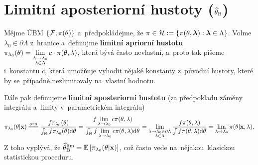 \section{Limitní aposteriorní hustoty ($\widehat{\theta}_\mathrm{B}$)}
\begin{define}
	Mějme ÚBM $\{\mathcal{F},\pi(\theta)\}$ a~předpokládejme, že $\pi\in\mathcal{H}:=\{\pi(\theta,\boldsymbol{\lambda}):\boldsymbol{\lambda}\in\Lambda\}$. Volme $\lambda_0\in\partial\Lambda$ z~hranice a~definujme \textbf{limitní apriorní hustotu} $\pi_{\lambda_0}(\theta)=\lim\limits_{\substack{
			\lambda\to\lambda_0\\\lambda\in\Lambda	}
	}c\cdot \pi(\theta,\lambda)$, která bývá často nevlastní, a~proto tak píšeme i~konstantu $c$, která umožňuje vyhodit nějaké konstanty z~původní hustoty, které by se~případně nezlimitovaly na~vlastní hodnotu. 
\end{define}

\begin{define}
	Dále pak definujeme \textbf{limitní aposteriorní hustotu} (za předpokladu záměny integrálu a~limity v~parametrickém integrálu) $$\pi_{\lambda_0}(\t|\textbf{x})\equal{ozn}\frac{f\pi_{\lambda_0}(\t)}{\int_\Theta f\pi_{\lambda_0}(\t)\d\t}=\frac{f\lim\limits_{\lambda\to\lambda_0}c\pi(\t,\lambda)}{\int_\Theta f\lim\limits_{\lambda\to\lambda_0}c\pi(\t,\lambda) \d\t}=\lim\limits_{\substack{
			\lambda\to\lambda_0\in\partial\Lambda\\\lambda\in\Lambda	}
	}\frac{f\pi(\t,\lambda)}{\int f\pi(\t,\lambda)\d\t}=\lim\limits_{\lambda\to\lambda_0}\pi(\t|\textbf{x},\lambda).$$
	Z toho vyplývá, že $\widehat{\theta}_{\mathrm{{\footnotesize B }}}^\mathrm{lim} =\mathbb{E}\left[ \pi_{\lambda_0}(\theta|\textbf{x}) \right]$, což často vede na~nějakou~klasickou statistickou proceduru.
\end{define}

